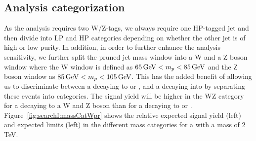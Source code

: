 \subsection{Analysis categorization}
As the analysis requires two W/Z-tags, we always require one HP-tagged jet and then divide into LP and HP categories depending on whether the other jet is of high or low purity. In addition, in order to further enhance the analysis sensitivity, we further split the pruned jet mass window into a W and a Z boson window where the W window is defined as $65 {\,\text{Ge\hspace{-.08em}V}} < m_{p} < 85 {\,\text{Ge\hspace{-.08em}V}}$ and the Z boson window as $85 {\,\text{Ge\hspace{-.08em}V}} < m_{p} < 105 {\,\text{Ge\hspace{-.08em}V}}$. This has the added benefit of allowing us to discriminate between a \BulkG decaying to \WW or \ZZ, and a \PWpr decaying into \WZ by separating these events into categories. The signal yield will be higher in the WZ category for a \PWpr decaying to a W and Z boson than for a \BulkG decaying to \WW or \ZZ. Figure~\ref{fig:searchI:massCatWpr} shows the relative expected signal yield (left) and expected limits (left) in the different mass categories for a \PWpr with a mass of 2 TeV.
